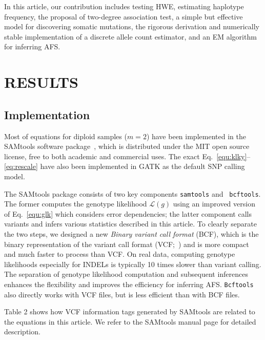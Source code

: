 \documentclass{bioinfo}
\begin{document}
\begin{methods}
In this article, our contribution includes testing HWE, estimating haplotype
frequency, the proposal of two-degree association test, a simple but effective
model for discovering somatic mutations, the rigorous derivation and
numerically stable implementation of a discrete allele count estimator, and an
EM algorithm for inferring AFS.

\end{methods}

\section{RESULTS}
\subsection{Implementation}
Most of equations for diploid samples ($m=2$) have been implemented in the
SAMtools software package~\citep{Li:2009ys}, which is distributed under the MIT
open source license, free to both academic and commercial uses. The exact
Eq.~\eqref{equ:klky}--\eqref{eq:rescale} have also been implemented in GATK as
the default SNP calling model.

The SAMtools package consists of two key components {\tt samtools} and {\tt
bcftools}.  The former computes the genotype likelihood $\mathcal{L}(g)$ using
an improved version of Eq.~\eqref{equ:glk} which considers error dependencies;
the latter component calls variants and infers various statistics described in this
article. To clearly separate the two steps, we designed a new \emph{Binary
variant call format} (BCF), which is the binary representation of the variant
call format (VCF;~\citealp{Danecek:2011fk}) and is more compact and much faster to
process than VCF.  On real data, computing genotype likelihoods especially for
INDELs is typically 10 times slower than variant calling. The separation of
genotype likelihood computation and subsequent inferences enhances the
flexibility and improves the efficiency for inferring AFS. {\tt Bcftools} also
directly works with VCF files, but is less efficient than with BCF files.

Table 2 shows how VCF information tags generated by SAMtools are related
to the equations in this article. We refer to the SAMtools manual page
for detailed description.
\end{document}
